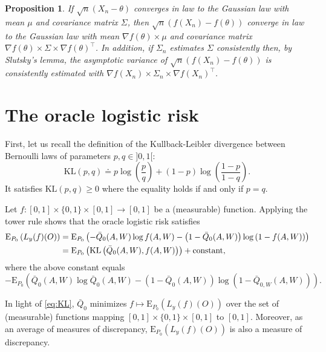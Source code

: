 \documentclass[
  11pt,
  openright,twoside]{book}
\newcommand{\defq}{\doteq}
\newcommand{\Exp}{\textrm{E}}
\newcommand{\Qbar}{\bar{Q}}
\newtheorem{proposition}{Proposition}[chapter]
\theoremstyle{definition}
\theoremstyle{definition}
\theoremstyle{definition}
\theoremstyle{definition}
\theoremstyle{remark}
\begin{document}
\begin{proposition}
\protect\hypertarget{prp:unnamed-chunk-6}{}\label{prp:unnamed-chunk-6}If \(\sqrt{n} (X_{n} - \theta)\) converges in law to the Gaussian law with mean
\(\mu\) and covariance matrix \(\Sigma\), then \(\sqrt{n} (f(X_{n}) - f(\theta))\)
converge in law to the Gaussian law with mean \(\nabla f(\theta) \times \mu\)
and covariance matrix \(\nabla f(\theta) \times \Sigma \times \nabla f(\theta)^{\top}\). In addition, if \(\Sigma_{n}\) estimates \(\Sigma\)
consistently then, by Slutsky's lemma, the asymptotic variance of \(\sqrt{n} (f(X_{n}) - f(\theta))\) is consistently estimated with \(\nabla f(X_{n}) \times \Sigma_{n} \times \nabla f(X_{n})^{\top}\).
\end{proposition}

\hypertarget{oracle-logistic-risk}{%
\section{The oracle logistic risk}\label{oracle-logistic-risk}}

First, let us recall the definition of the Kullback-Leibler divergence between
Bernoulli laws of parameters \(p,q\in]0,1[\):
\begin{equation*}\text{KL}(p,q)  \defq  p \log\left(\frac{p}{q}\right)  +
(1-p) \log \left(\frac{1-p}{1-q}\right).\end{equation*}
It satisfies \(\text{KL}(p,q) \geq 0\) where the equality holds if and only if
\(p=q\).

Let \(f:[0,1] \times \{0,1\} \times [0,1] \to [0,1]\) be a (measurable)
function. Applying the tower rule shows that the oracle logistic risk
satisfies
\begin{align} 
\Exp_{P_{0}}  \left(L_{y}   (f)(O)\right)&=\Exp_{P_{0}}  \left(-\Qbar_{0}(A,W)
\log   f(A,W)   -   \left(1   -  \Qbar_{0}   (A,W)\right)   \log   \left(1   -
f(A,W)\right)\right)\notag\\&=\Exp_{P_{0}}
\left(\text{KL}\left(\Qbar_{0}(A,W),           f(A,W)\right)\right)          +
\text{constant},\label{eq:KL} 
\end{align}
where the above constant equals \begin{equation*} -\Exp_{P_{0}}\left(\Qbar_{0}(A,W) \log \Qbar_{0}(A,W) - \left(1 - \Qbar_{0} (A,W)\right) \log \left(1 - \Qbar_{0,W}(A,W)\right)\right).  \end{equation*}

In light of \eqref{eq:KL}, \(\Qbar_{0}\) minimizes \(f \mapsto \Exp_{P_{0}} \left(L_{y} (f)(O)\right)\) over the set of (measurable) functions mapping
\([0,1] \times \{0,1\} \times [0,1]\) to \([0,1]\). Moreover, as an average of
measures of discrepancy, \(\Exp_{P_{0}} \left(L_{y} (f)(O)\right)\) is also a
measure of discrepancy.
\end{document}
